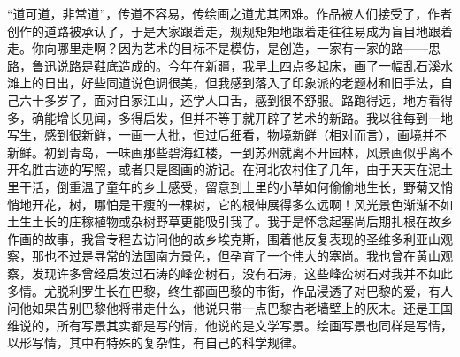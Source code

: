 \documentclass{article}
\begin{document}
“道可道，非常道”，传道不容易，传绘画之道尤其困难。作品被人们接受了，作者创作的道路被承认了，于是大家跟着走，规规矩矩地跟着走往往易成为盲目地跟着走。你向哪里走啊？因为艺术的目标不是模仿，是创造，一家有一家的路——思路，鲁迅说路是鞋底造成的。今年在新疆，我早上四点多起床，画了一幅乱石溪水滩上的日出，好些同道说色调很美，但我感到落入了印象派的老题材和旧手法，自己六十多岁了，面对自家江山，还学人口舌，感到很不舒服。路跑得远，地方看得多，确能增长见闻，多得启发，但并不等于就开辟了艺术的新路。我以往每到一地写生，感到很新鲜，一画一大批，但过后细看，物境新鲜（相对而言），画境并不新鲜。初到青岛，一味画那些碧海红楼，一到苏州就离不开园林，风景画似乎离不开名胜古迹的写照，或者只是图画的游记。在河北农村住了几年，由于天天在泥土里干活，倒重温了童年的乡土感受，留意到土里的小草如何偷偷地生长，野菊又悄悄地开花，树，哪怕是干瘦的一棵树，它的根伸展得多么远啊！风光景色渐渐不如土生土长的庄稼植物或杂树野草更能吸引我了。我于是怀念起塞尚后期扎根在故乡作画的故事，我曾专程去访问他的故乡埃克斯，围着他反复表现的圣维多利亚山观察，那也不过是寻常的法国南方景色，但孕育了一个伟大的塞尚。我也曾在黄山观察，发现许多曾经启发过石涛的峰峦树石，没有石涛，这些峰峦树石对我并不如此多情。尤脱利罗生长在巴黎，终生都画巴黎的市街，作品浸透了对巴黎的爱，有人问他如果告别巴黎他将带走什么，他说只带一点巴黎古老墙壁上的灰末。还是王国维说的，所有写景其实都是写的情，他说的是文学写景。绘画写景也同样是写情，以形写情，其中有特殊的复杂性，有自己的科学规律。
\end{document}
